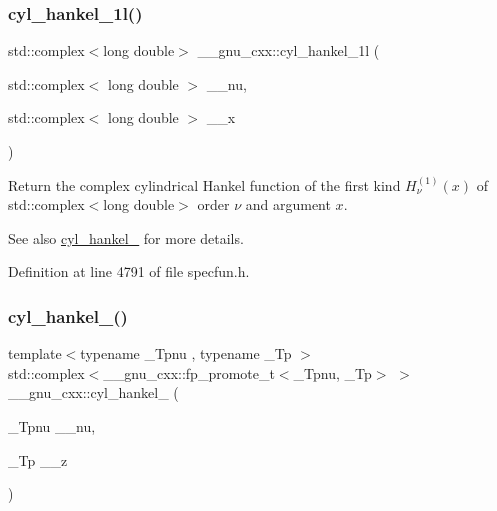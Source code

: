 \subsubsection{\texorpdfstring{cyl\+\_\+hankel\+\_\+1l()}{cyl\_hankel\_1l()}\hspace{0.1cm}{\footnotesize\ttfamily [2/2]}}
{\footnotesize\ttfamily std\+::complex$<$long double$>$ \+\_\+\+\_\+gnu\+\_\+cxx\+::cyl\+\_\+hankel\+\_\+1l (\begin{DoxyParamCaption}\item[{std\+::complex$<$ long double $>$}]{\+\_\+\+\_\+nu,  }\item[{std\+::complex$<$ long double $>$}]{\+\_\+\+\_\+x }\end{DoxyParamCaption})\hspace{0.3cm}{\ttfamily [inline]}}

Return the complex cylindrical Hankel function of the first kind $ H^{(1)}_\nu(x) $ of {\ttfamily std\+::complex$<$long double$>$} order $ \nu $ and argument $ x $.

\begin{DoxySeeAlso}{See also}
\hyperlink{group__gnu__math__spec__func_ga5329bba77d10a9d2f15d9bbe43a70db3}{cyl\+\_\+hankel\+\_} for more details. 
\end{DoxySeeAlso}


Definition at line 4791 of file specfun.\+h.

\mbox{\label{group__gnu__math__spec__func_ga7ebc71dd48ac97255d72f5f5f43dfd8e}} 
\subsubsection{\texorpdfstring{cyl\+\_\+hankel\+\_()}{cyl\_hankel\_2()}\hspace{0.1cm}{\footnotesize\ttfamily [1/2]}}
{\footnotesize\ttfamily template$<$typename \+\_\+\+Tpnu , typename \+\_\+\+Tp $>$ \\
std\+::complex$<$\+\_\+\+\_\+gnu\+\_\+cxx\+::fp\+\_\+promote\+\_\+t$<$\+\_\+\+Tpnu, \+\_\+\+Tp$>$ $>$ \+\_\+\+\_\+gnu\+\_\+cxx\+::cyl\+\_\+hankel\+\_ (\begin{DoxyParamCaption}\item[{\+\_\+\+Tpnu}]{\+\_\+\+\_\+nu,  }\item[{\+\_\+\+Tp}]{\+\_\+\+\_\+z }\end{DoxyParamCaption})\hspace{0.3cm}{\ttfamily [inline]}}

